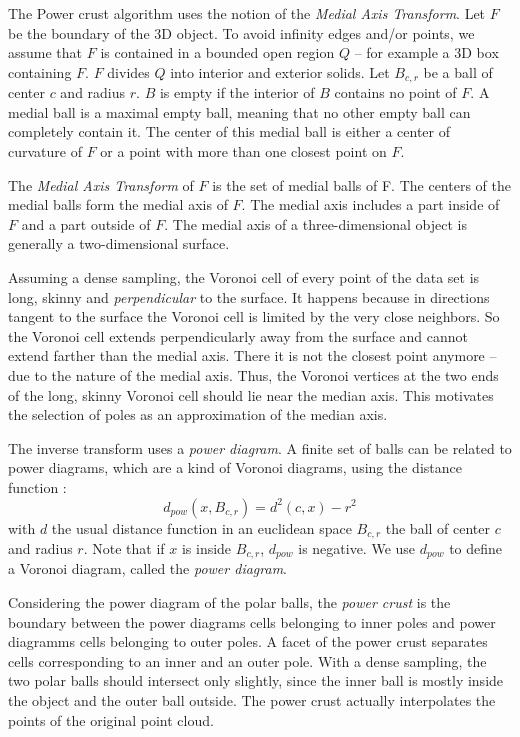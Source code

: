 \documentclass[a4paper]{article}
\begin{document}
The Power crust algorithm uses the notion of the \textit{Medial Axis Transform}. Let $F$ be the boundary of the 3D object. To avoid infinity edges and/or points, we assume that $F$ is contained in a bounded open region $Q$ -- for example a 3D box containing $F$. $F$ divides $Q$ into interior and exterior solids. Let $B_{c,r}$ be a ball of center $c$ and radius $r$. $B$ is empty if the interior of $B$ contains no point of $F$. A medial ball is a maximal empty ball, meaning that no other empty ball can completely contain it. The center of this medial ball is either a center of curvature of $F$ or a point with more than one closest point on $F$.

The \textit{Medial Axis Transform} of $F$ is the set of medial balls of F. The centers of the medial balls form the medial axis of $F$. The medial axis includes a part inside of $F$ and a part outside of $F$. The medial axis of a three-dimensional object is generally a two-dimensional surface.

Assuming a dense sampling, the Voronoi cell of every point of the data set is long, skinny and \textit{perpendicular} to the surface. It happens because in directions tangent to the surface the Voronoi cell is limited by the very close neighbors. So the Voronoi cell extends perpendicularly away from the surface and cannot extend farther than the medial axis. There it is not the closest point anymore -- due to the nature of the medial axis. Thus, the Voronoi vertices at the two ends of the long, skinny Voronoi cell should lie near the median axis. This motivates the selection of poles as an approximation of the median axis.

The inverse transform uses a \textit{power diagram}. A finite set of balls can be related to power diagrams, which are a kind of Voronoi diagrams, using the distance function :
$$d_{pow}(x, B_{c,r}) = d^2(c,x) - r^2$$
with $d$ the usual distance function in an euclidean space  $B_{c,r}$ the ball of center $c$ and radius $r$. Note that if $x$ is inside $B_{c,r}$, $d_{pow}$ is negative. We use $d_{pow}$ to define a Voronoi diagram, called the \textit{power diagram}.

Considering the power diagram of the polar balls, the \textit{power crust} is the boundary between the power diagrams cells belonging to inner poles and power diagramms cells belonging to outer poles. A facet of the power crust separates cells corresponding to an inner and an outer pole. With a dense sampling, the two polar balls should intersect only slightly, since the inner ball is mostly inside the object and the outer ball outside. The power crust actually interpolates the points of the original point cloud.
\end{document}
